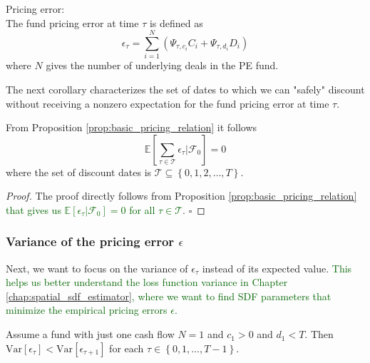 \fi


\begin{definition}
	\label{def:pricing_error}
	Pricing error: \\
	The fund pricing error at time $\tau$ is defined as
	\[
	\epsilon_{\tau} = \sum_{i=1}^N \left( \Psi_{\tau,c_i} C_i + \Psi_{\tau,d_i} D_i \right)
	\]
	where $N$ gives the number of underlying deals in the PE fund.
\end{definition}


The next corollary characterizes the set of dates to which we can "safely" discount without receiving a nonzero expectation for the fund pricing error at time $\tau$.


\begin{corollary}
	\label{coro:expected_epsillion}
	From Proposition \ref{prop:basic_pricing_relation} it follows
	\[
	\mathbb{E} \left[ \sum_{\tau \in \mathcal{T}} \epsilon_{\tau} | \mathcal{F}_{0}  \right] = 0
	\]
	where the set of discount dates is $\mathcal{T} \subseteq \left\{0, 1, 2, \dots, T \right\}$.
\end{corollary}


\begin{proof}
	The proof directly follows from Proposition \ref{prop:basic_pricing_relation} \textcolor{darkgreen}{that gives us $\mathbb{E} \left[ \epsilon_{\tau} | \mathcal{F}_{0}  \right] = 0$ for all $\tau \in \mathcal{T}$}.
	$\square$
\end{proof}


\subsubsection{Variance of the pricing error $\epsilon$}


Next, we want to focus on the variance of $\epsilon_{\tau}$ instead of its expected value.
\textcolor{darkgreen}{
	This helps us better understand the loss function variance in Chapter \ref{chap:spatial_sdf_estimator}, where we want to find SDF parameters that minimize the empirical pricing errors $\epsilon$.
}

\begin{lemma}
	\label{lemma:variance_epsilon}
	Assume a fund with just one cash flow $N=1$ and $c_1 > 0$ and $d_1 < T$.
	Then $\mathrm{Var} \left[ \epsilon_{\tau} \right] < \mathrm{Var} \left[ \epsilon_{\tau+1} \right]$ for each $\tau \in \left\{ 0, 1, \dots, T-1 \right\}$.
\end{lemma}

